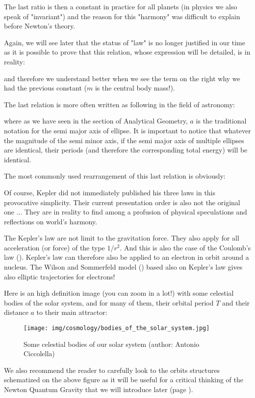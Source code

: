 	The last ratio is then a constant in practice for all planets (in physics we also speak of "invariant") and the reason for this "harmony" was difficult to explain before Newton's theory.
	
	Again, we will see later that the status of "law" is no longer justified in our time as it is possible to prove that this relation, whose expression will be detailed, is in reality:
	
	and therefore we understand better when we see the term on the right why we had the previous constant ($m$ is the central body mass!).
	
	The last relation is more often written as following in the field of astronomy:
	
	where as we have seen in the section of Analytical Geometry, $a$ is the traditional notation for the semi major axis of ellipse. It is important to notice that whatever the magnitude of the semi minor axis,  if the semi major axis of multiple ellipses are identical, their periods (and therefore the corresponding total energy) will be identical.
	
	The most commonly used rearrangement of this last relation is obviously:
	
		
	Of course, Kepler did not immediately published his three laws in this provocative simplicity. Their current presentation order is also not the original one ... They are  in reality to find among  a profusion of physical speculations and reflections on world's harmony.
	
	\begin{tcolorbox}[title=Remark,colframe=black,arc=10pt]
	The Kepler's law are not limit to the gravitation force. They also apply for all acceleration (or force) of the type $1/r^2$. And this is also the case of the Coulomb's law (). Kepler's law can therefore also be applied to an electron in orbit around a nucleus. The Wilson and Sommerfeld model () based also on Kepler's law gives also elliptic trajectories for electrons!
	\end{tcolorbox}	
	Here is an high definition image (you can zoom in a lot!) with some celestial bodies of the solar system, and for many of them, their orbital period $T$ and their distance $a$ to their main attractor:
	\begin{figure}[H]
		\centering
		\texttt{[image: img/cosmology/bodies\_of\_the\_solar\_system.jpg]}
		\caption[Some celestial bodies of our solar system]{Some celestial bodies of our solar system (author: Antonio Ciccolella)}
	\end{figure}
	We also recommend the reader to carefully look to the orbits structures schematized on the above figure as it will be useful for a critical thinking of the Newton Quantum Gravity that we will introduce later (page \pageref{newton quantum gravity}).
	

